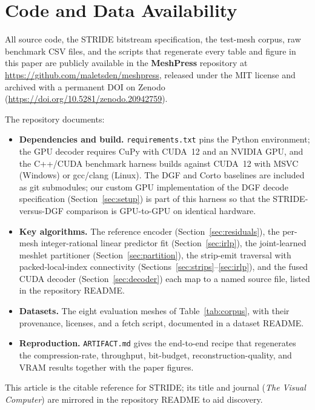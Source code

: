 \documentclass[pdflatex,sn-vancouver-num]{sn-jnl}%
\theoremstyle{thmstyleone}%
\theoremstyle{thmstyletwo}%
\theoremstyle{thmstylethree}%
\begin{document}
\section{Code and Data Availability}\label{sec:availability}

All source code, the STRIDE bitstream specification, the test-mesh corpus, raw benchmark CSV files, and the scripts that regenerate every table and figure in this paper are publicly available in the \textbf{MeshPress} repository at \url{https://github.com/maletsden/meshpress}, released under the MIT license and archived with a permanent DOI on Zenodo (\url{https://doi.org/10.5281/zenodo.20942759}).

The repository documents:

\begin{itemize}
\item \textbf{Dependencies and build.} \texttt{requirements.txt} pins the Python environment; the GPU decoder requires CuPy with CUDA~12 and an NVIDIA GPU, and the C++/CUDA benchmark harness builds against CUDA~12 with MSVC (Windows) or gcc/clang (Linux). The DGF and Corto baselines are included as git submodules; our custom GPU implementation of the DGF decode specification (Section~\ref{sec:setup}) is part of this harness so that the STRIDE-versus-DGF comparison is GPU-to-GPU on identical hardware.
\item \textbf{Key algorithms.} The reference encoder (Section~\ref{sec:residuals}), the per-mesh integer-rational linear predictor fit (Section~\ref{sec:irlp}), the joint-learned meshlet partitioner (Section~\ref{sec:partition}), the strip-emit traversal with packed-local-index connectivity (Sections~\ref{sec:strips}--\ref{sec:irlp}), and the fused CUDA decoder (Section~\ref{sec:decoder}) each map to a named source file, listed in the repository README.
\item \textbf{Datasets.} The eight evaluation meshes of Table~\ref{tab:corpus}, with their provenance, licenses, and a fetch script, documented in a dataset README.
\item \textbf{Reproduction.} \texttt{ARTIFACT.md} gives the end-to-end recipe that regenerates the compression-rate, throughput, bit-budget, reconstruction-quality, and VRAM results together with the paper figures.
\end{itemize}

This article is the citable reference for STRIDE; its title and journal (\emph{The Visual Computer}) are mirrored in the repository README to aid discovery.
\end{document}
